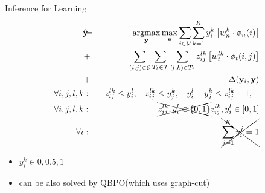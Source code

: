 \documentclass{beamer}
\DeclareMathOperator*{\argmax}{argmax}
\newcommand{\y}{{\mathbf y}}     %
\newcommand{\ysc}[2]{{y_{#1}^{#2}}}    %
\newcommand{\zsc}[2]{{z_{#1}^{#2}}}    %
\newcommand{\fn}[1]{{\phi_n(#1)}}      %
\newcommand{\fe}[3]{{\phi_{#1}(#2,#3)}}%
\newcommand{\wn}[1]{{w_n^{#1}}}        %
\newcommand{\we}[3]{{w_{#1}^{#2#3}}}   %
\newcommand{\loss}[2]{{\Delta(#1,#2)}}   %
\begin{document}

\begin{frame}{Inference for Learning}
 \begin{eqnarray*}
\hat{\y}\!\!\!&=&\!\!\!\argmax_{\y}\max_{\mathbf z} \sum_{i \in \mathcal{V}} \sum_{k=1}^{K} \ysc{i}{k} \left[\wn{k} \cdot \fn{i} \right] \\
&+&  \!\!\!\sum_{(i,j)\in \mathcal{E}}  \sum_{T_t \in {\cal T}} \sum_{(l,k)\in T_t} \zsc{ij}{lk} \left[\we{t}{l}{k} \cdot \fe{t}{i}{j}\right] \\
&+& \loss{\y_i}{\y} \label{eq:relaxobj}\\
\forall i,j,l,k &:& \:\: \zsc{ij}{lk}\le \ysc{i}{l}, \:\:\:\:
\zsc{ij}{lk}\le \ysc{j}{k},\:\:\:\:
\ysc{i}{l} + \ysc{j}{k} \le \zsc{ij}{lk}+1,\:\:\:\: \\
\forall i,j,l,k &:& \xcancel{ \zsc{ij}{lk},\ysc{i}{l} \in \{ 0,1 \} } \zsc{ij}{lk},\ysc{i}{l} \in [ 0,1 ] \\
\forall i &:& \xcancel{\sum_{j=1}^{K} y_i^j = 1 }
\end{eqnarray*} 

\begin{itemize}
 \item $y_i^k\in{0,0.5,1}$
 \item can be also solved by QBPO(which uses graph-cut)
\end{itemize}

\end{frame}
\end{document}
